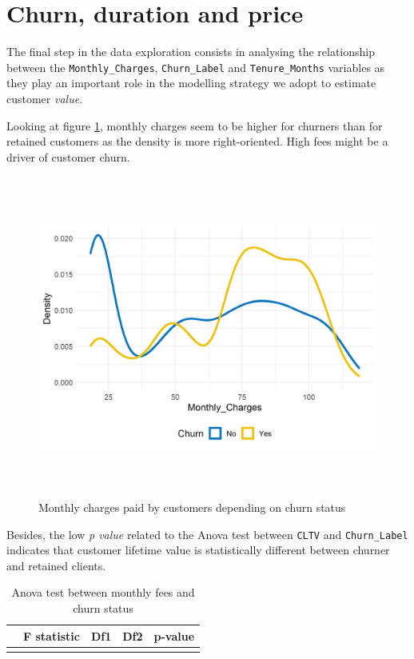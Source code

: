 \documentclass[
]{book}
\begin{document}
\hypertarget{churn-duration-and-price}{%
\section{Churn, duration and price}\label{churn-duration-and-price}}

The final step in the data exploration consists in analysing the relationship between the \texttt{Monthly\_Charges}, \texttt{Churn\_Label} and \texttt{Tenure\_Months} variables as they play an important role in the modelling strategy we adopt to estimate customer \emph{value}.

Looking at figure \ref{fig:cltvchurn}, monthly charges seem to be higher for churners than for retained customers as the density is more right-oriented. High fees might be a driver of customer churn.

\begin{figure}

{\centering \includegraphics[width=400pt,height=300pt]{./imgs/monthly_charges_churn_plot} 

}

\caption{Monthly charges paid by customers depending on churn status}\label{fig:cltvchurn}
\end{figure}

Besides, the low \emph{p value} related to the Anova test between \texttt{CLTV} and \texttt{Churn\_Label} indicates that customer lifetime value is statistically different between churner and retained clients.

\begin{table}[H]

\caption{\label{tab:aovcltvchurn}Anova test between monthly fees and churn status}
\centering
\begin{tabular}[t]{lrrrl}
\toprule
  & F statistic & Df1 & Df2 & p-value\\
\midrule
\cellcolor{gray!6}{Churn\_Label} & \cellcolor{gray!6}{271.58} & \cellcolor{gray!6}{1} & \cellcolor{gray!6}{7030} & \cellcolor{gray!6}{6.8e-60}\\
\bottomrule
\end{tabular}
\end{table}
\end{document}
